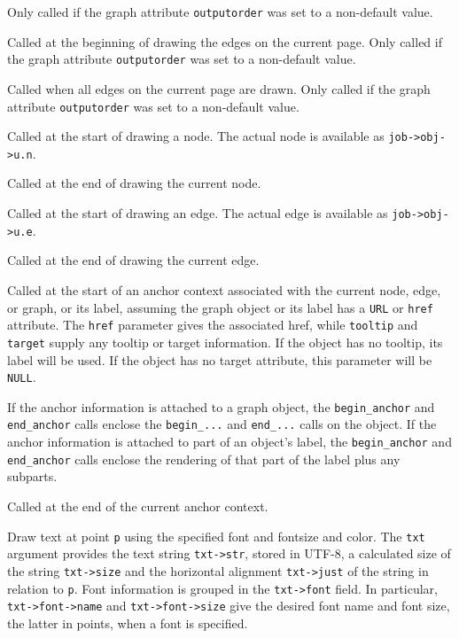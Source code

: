 \begin{description}
Only called if the graph attribute {\tt outputorder} was set to a non-default
value.
\item[{\tt begin\_edges(job)}]
Called at the beginning of drawing the edges on the current page.
Only called if the graph attribute {\tt outputorder} was set to a non-default
value.
\item[{\tt end\_edges()}]
Called when all edges on the current page are drawn.
Only called if the graph attribute {\tt outputorder} was set to a non-default
value.
\item[{\tt begin\_node(job)}]
Called at the start of drawing a node.
The actual node is available as {\tt job->obj->u.n}.
\item[{\tt end\_node(job)}]
Called at the end of drawing the current node.
\item[{\tt begin\_edge(job)}]
Called at the start of drawing an edge.
The actual edge is available as {\tt job->obj->u.e}.
\item[{\tt end\_edge(job)}]
Called at the end of drawing the current edge.
\item[{\tt begin\_anchor(job,href,tooltip,target)}]
Called at the start of an anchor context associated
with the current node, edge, or graph, or its label, assuming the graph
object or its label has a {\tt URL} or {\tt href} attribute. The
{\tt href} parameter gives the associated href, while
{\tt tooltip} and {\tt target} supply any tooltip or target information.
If the object has no tooltip, its label will be used. 
If the object has no target attribute, this parameter will be {\tt NULL}.

If the anchor information is attached to a graph object,
the {\tt begin\_anchor} and {\tt end\_anchor} calls 
enclose the {\tt begin\_...} and {\tt end\_...} calls on the object.
If the anchor information is attached to part of an object's label,
the {\tt begin\_anchor} and {\tt end\_anchor} calls 
enclose the rendering of that part of the label plus any subparts.
\item[{\tt end\_anchor(job)}]
Called at the end of the current anchor context.
\item[{\tt textspan(job, p, txt)}]
Draw text at point {\tt p} using the specified font and fontsize and color. 
The {\tt txt} argument provides the text string {\tt txt->str},
stored in UTF-8,
a calculated size of the string {\tt txt->size} and
the horizontal alignment {\tt txt->just} of the string in relation to {\tt p}.
Font information is grouped in the {\tt txt->font} field. In particular,
{\tt txt->font->name} and {\tt txt->font->size} give the desired
font name and font size, the latter in points, when a font is specified.


\end{description}
